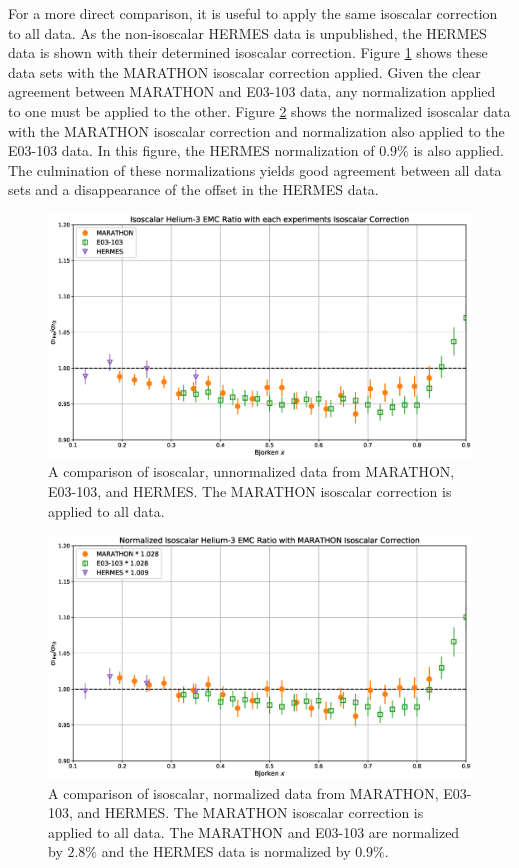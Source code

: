 For a more direct comparison, it is useful to apply the same isoscalar correction to all data. As the non-isoscalar HERMES data is unpublished, the HERMES data is shown with their determined isoscalar correction. Figure \ref{fig:maraisocomp} shows these data sets with the MARATHON isoscalar correction applied. Given the clear agreement between MARATHON and E03-103 data, any normalization applied to one must be applied to the other. Figure \ref{fig:maraisonormcomp} shows the normalized isoscalar data with the MARATHON isoscalar correction and normalization also applied to the E03-103 data. In this figure, the HERMES normalization of $0.9\%$ is also applied. The culmination of these normalizations yields good agreement between all data sets and a disappearance of the offset in the HERMES data.

\begin{figure}[p]
	\includegraphics[width=\textwidth]{./results/fig/maraiso_comp.eps}
	\caption{A comparison of isoscalar, unnormalized data from MARATHON, E03-103, and HERMES. The MARATHON isoscalar correction is applied to all data.}
	\label{fig:maraisocomp}
\end{figure}

\begin{figure}[p]
	\includegraphics[width=\textwidth]{./results/fig/maraisonorm_comp.eps}
	\caption{A comparison of isoscalar, normalized data from MARATHON, E03-103, and HERMES. The MARATHON isoscalar correction is applied to all data. The MARATHON and E03-103 are normalized by $2.8\%$ and the HERMES data is normalized by $0.9\%$.}
	\label{fig:maraisonormcomp}
\end{figure}


